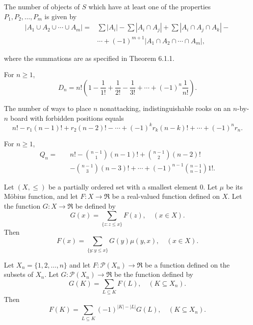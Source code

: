 \begin{corollary}
    \label{cor:6.1.2}
The number of objects of $S$ which have at least one of the properties $P_1, P_2, \ldots, P_m$ is given by
\begin{align*}
    |A_1 \cup A_2 \cup \cdots \cup A_m| 
    = & \sum |A_i| - \sum |A_i \cap A_j| + \sum |A_i \cap A_j \cap A_k| - \\
    & \cdots + (-1)^{m+1} |A_1 \cap A_2 \cap \cdots \cap A_m|,
\tag{6.3}
\end{align*}

where the summations are as specified in Theorem 6.1.1.
\end{corollary}

\begin{theorem}
    \label{thm:6.3.1}
For $n \geq 1$,
\[
D_n = n! \left( 1 - \frac{1}{1!} + \frac{1}{2!} - \frac{1}{3!} + \cdots + (-1)^n \frac{1}{n!} \right).
\]
\end{theorem}

\begin{theorem}
    \label{thm:6.4.1}
The number of ways to place $n$ nonattacking, indistinguishable rooks on an $n$-by-$n$ board with forbidden positions equals
\[
n! - r_1 (n-1)! + r_2 (n-2)! - \cdots + (-1)^k r_k (n-k)! + \cdots + (-1)^n r_n.
\]
\end{theorem}

\begin{theorem}
    \label{thm:6.5.1}
For $n \geq 1$,
\begin{align*}
    Q_n = \quad & n! - \binom{n-1}{1}(n-1)! + \binom{n-1}{2}(n-2)! \\
    & - \binom{n-1}{3}(n-3)! + \cdots + (-1)^{n-1} \binom{n-1}{n-1}1!.
\end{align*}

\end{theorem}

\begin{theorem}
    \label{thm:6.6.1}
Let $(X, \leq)$ be a partially ordered set with a smallest element $0$. Let $\mu$ be its Möbius function, and let $F : X \to \Re$ be a real-valued function defined on $X$. Let the function $G : X \to \Re$ be defined by
\[
G(x) = \sum_{\{z : z \leq x\}} F(z), \quad (x \in X).
\]
Then
\[
F(x) = \sum_{\{y : y \leq x\}} G(y) \mu(y, x), \quad (x \in X).
\]
\end{theorem}

\begin{corollary}
    \label{cor: 6.6.2}
Let $X_n = \{1, 2, \ldots, n\}$ and let $F : \mathcal{P}(X_n) \to \Re$ be a function defined on the subsets of $X_n$. Let $G : \mathcal{P}(X_n) \to \Re$ be the function defined by
\[
G(K) = \sum_{L \subseteq K} F(L), \quad (K \subseteq X_n).
\]
Then
\[
F(K) = \sum_{L \subseteq K} (-1)^{|K| - |L|} G(L), \quad (K \subseteq X_n).
\]
\end{corollary}

